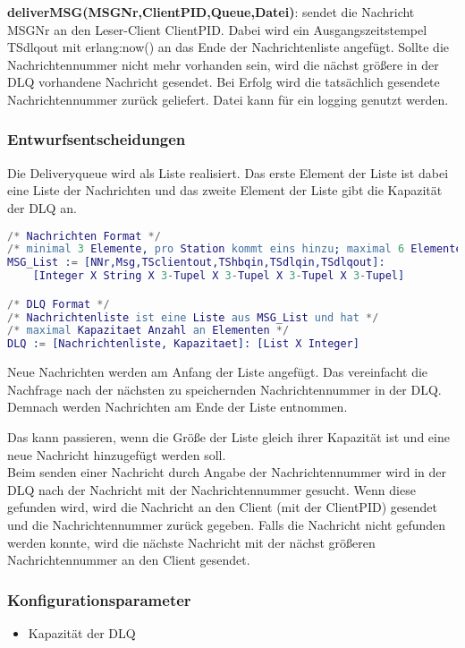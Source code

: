 \documentclass{article}
\begin{document}
\textbf{deliverMSG(MSGNr,ClientPID,Queue,Datei)}: sendet die Nachricht MSGNr an den Leser-Client ClientPID. Dabei wird ein Ausgangszeitstempel TSdlqout mit erlang:now() an das Ende der Nachrichtenliste angefügt. Sollte die Nachrichtennummer nicht mehr vorhanden sein, wird die nächst größere in der DLQ vorhandene Nachricht gesendet. Bei Erfolg wird die tatsächlich gesendete Nachrichtennummer zurück geliefert. Datei kann für ein logging genutzt werden.\\

\subsubsection{Entwurfsentscheidungen}
Die Deliveryqueue wird als Liste realisiert. Das erste Element der Liste ist dabei eine Liste der Nachrichten und das zweite Element der Liste gibt die Kapazität der DLQ an.
\begin{lstlisting}[language=erlang]
/* Nachrichten Format */
/* minimal 3 Elemente, pro Station kommt eins hinzu; maximal 6 Elemente */
MSG_List := [NNr,Msg,TSclientout,TShbqin,TSdlqin,TSdlqout]:
    [Integer X String X 3-Tupel X 3-Tupel X 3-Tupel X 3-Tupel]

/* DLQ Format */
/* Nachrichtenliste ist eine Liste aus MSG_List und hat */
/* maximal Kapazitaet Anzahl an Elementen */
DLQ := [Nachrichtenliste, Kapazitaet]: [List X Integer]
\end{lstlisting}

Neue Nachrichten werden am Anfang der Liste angefügt. Das vereinfacht die Nachfrage nach der nächsten zu speichernden Nachrichtennummer in der DLQ. Demnach werden Nachrichten am Ende der Liste entnommen.

Das kann passieren, wenn die Größe der Liste gleich ihrer Kapazität ist und eine neue Nachricht hinzugefügt werden soll.\\

Beim senden einer Nachricht durch Angabe der Nachrichtennummer wird in der DLQ nach der Nachricht mit der Nachrichtennummer gesucht. Wenn diese gefunden wird, wird die Nachricht an den Client (mit der ClientPID) gesendet und die Nachrichtennummer zurück gegeben. Falls die Nachricht nicht gefunden werden konnte, wird die nächste Nachricht mit der nächst größeren Nachrichtennummer an den Client gesendet.

\subsubsection{Konfigurationsparameter}
\begin{itemize}
    \item Kapazität der DLQ
\end{itemize}
\end{document}
